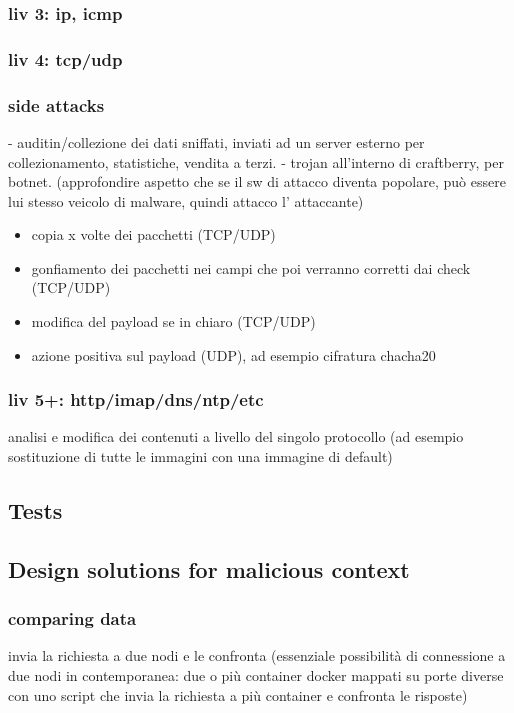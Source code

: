 \documentclass[]{article}
\begin{document}
			\subsubsection{liv 3: ip, icmp}
			\subsubsection{liv 4: tcp/udp}
			\subsubsection{side attacks}
				- auditin/collezione dei dati sniffati, inviati ad un server esterno per collezionamento, statistiche, vendita a terzi.
				- trojan all'interno di craftberry, per botnet. (approfondire aspetto che se il sw di attacco diventa popolare, può essere lui stesso veicolo di malware, quindi attacco l' attaccante)
			
			\begin{itemize}
				\item copia x volte dei pacchetti (TCP/UDP)
				\item gonfiamento dei pacchetti nei campi che poi verranno corretti dai check (TCP/UDP)
				\item modifica del payload se in chiaro (TCP/UDP)
				\item azione positiva sul payload (UDP), ad esempio cifratura chacha20
			\end{itemize}
		 	\subsubsection{liv 5+: http/imap/dns/ntp/etc}
				analisi e modifica dei contenuti a livello del singolo protocollo (ad esempio sostituzione di tutte le immagini con una immagine di default)
			
	\subsection{Tests}
	\subsection{Design solutions for malicious context}
		\subsubsection{comparing data}
		invia la richiesta a due nodi e le confronta (essenziale possibilità di connessione a due nodi in contemporanea: due o più container docker mappati su porte diverse con uno script che invia la richiesta a più container e confronta le risposte)
\end{document}
